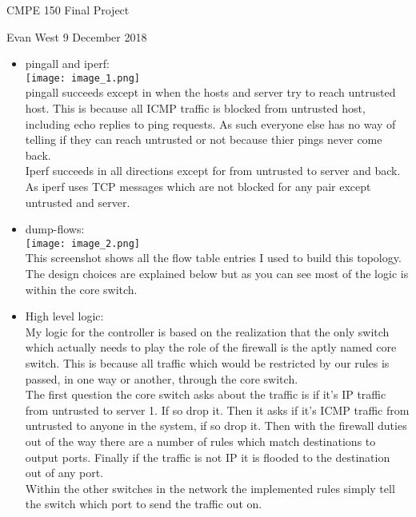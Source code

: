 \documentclass[11pt]{article}
\begin{document}
\centerline{\large CMPE 150 Final Project}
\vspace{2 mm} \centerline{Evan West \hspace{2 cm} 9 December 2018}
\begin{itemize}
\item{pingall and iperf:\\ \texttt{[image: image\_1.png]}\\
pingall succeeds except in when the hosts and server try to reach untrusted host. This is because all ICMP traffic is blocked from untrusted host, including echo replies to ping requests. As such everyone else has no way of telling if they can reach untrusted or not because thier pings never come back.\\
Iperf succeeds in all directions except for from untrusted to server and back. As iperf uses TCP messages which are not blocked for any pair except untrusted and server.
}
\newpage
\item{dump-flows:\\ \texttt{[image: image\_2.png]}\\
This screenshot shows all the flow table entries I used to build this topology. The design choices are explained below but as you can see most of the logic is within the core switch.
}
\item{
	High level logic:\\
	My logic for the controller is based on the realization that the only switch which actually needs to play the role of the firewall is the aptly named core switch. This is because all traffic which would be restricted by our rules is passed, in one way or another, through the core switch.\\
	The first question the core switch asks about the traffic is if it's IP traffic from untrusted to server 1. If so drop it. Then it asks if it's ICMP traffic from untrusted to anyone in the system, if so drop it. Then with the firewall duties out of the way there are a number of rules which match destinations to output ports. Finally if the traffic is not IP it is flooded to the destination out of any port.\\
	Within the other switches in the network the implemented rules simply tell the switch which port to send the traffic out on.
}
\end{itemize}
\end{document}
